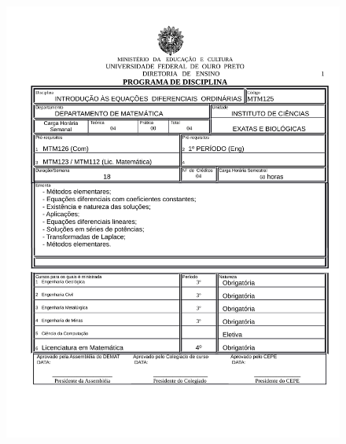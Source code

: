 \begin{figure}[p]
	\centering 
	\includegraphics[scale=0.7]{capitulos/anexo1-programas-disciplina/p34.pdf}
\end{figure}

